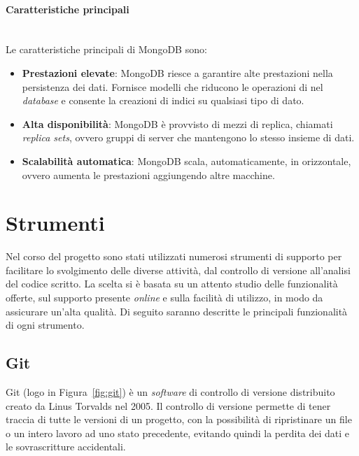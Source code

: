 \paragraph{Caratteristiche principali} \mbox{} \\
Le caratteristiche principali di MongoDB sono:
\begin{itemize}
\item \textbf{Prestazioni elevate}: MongoDB riesce a garantire alte prestazioni nella persistenza dei dati. Fornisce modelli che riducono le operazioni di  nel \textit{database} e consente la creazioni di indici su qualsiasi tipo di dato.
\item \textbf{Alta disponibilità}: MongoDB è provvisto di mezzi di replica, chiamati \textit{replica sets}, ovvero gruppi di server che mantengono lo stesso insieme di dati.
\item \textbf{Scalabilità automatica}: MongoDB scala, automaticamente, in orizzontale, ovvero aumenta le prestazioni aggiungendo altre macchine.
\end{itemize}

\section{Strumenti}
Nel corso del progetto sono stati utilizzati numerosi strumenti di supporto per facilitare lo svolgimento delle diverse attività, dal controllo di versione all'analisi del codice scritto. La scelta si è basata su un attento studio delle funzionalità offerte, sul supporto presente \textit{online} e sulla facilità di utilizzo, in modo da assicurare un'alta qualità. Di seguito saranno descritte le principali funzionalità di ogni strumento.

\subsection{Git}
Git (logo in Figura~\ref{fig:git}) è un \textit{software} di controllo di versione distribuito creato da Linus Torvalds nel 2005. Il controllo di versione permette di tener traccia di tutte le versioni di un progetto, con la possibilità di ripristinare un file o un intero lavoro ad uno stato precedente, evitando quindi la perdita dei dati e le sovrascritture accidentali.

